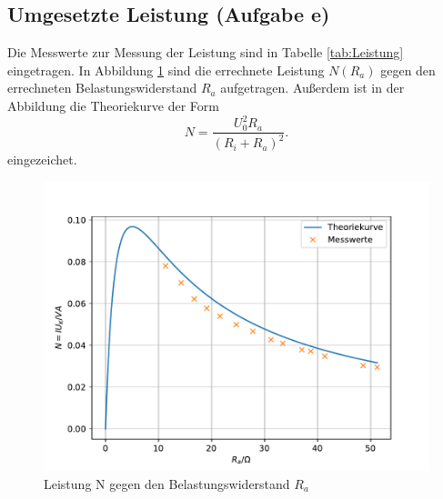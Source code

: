 \subsection{Umgesetzte Leistung (Aufgabe e)}
Die Messwerte zur Messung der Leistung sind in Tabelle \ref{tab:Leistung} eingetragen.
In Abbildung \ref{fig:Leistung} sind die errechnete Leistung $N(R_{a})$ gegen den errechneten Belastungswiderstand $R_{a}$ aufgetragen.
Außerdem ist in der Abbildung die Theoriekurve der Form
\begin{equation*}
  N=\frac{U_{0}^2 R_{a}}{\left(R_{i} + R_{a} \right)^2}.
\end{equation*}
eingezeichet.

\begin{figure}[h!]
  \centering
  \includegraphics[width=\textwidth]{Leistung.pdf}
  \caption{Leistung N gegen den Belastungswiderstand $R_{a}$}
  \label{fig:Leistung}
\end{figure}
\FloatBarrier
